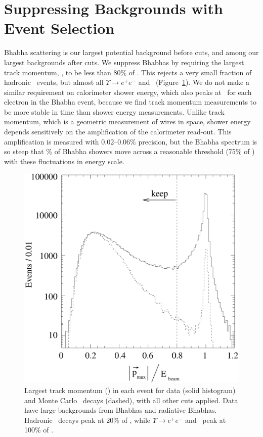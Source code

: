 \documentclass{cornell}
\begin{document}
\section{Suppressing Backgrounds with Event Selection}

Bhabha scattering is our largest potential background before cuts, and
among our largest backgrounds after cuts.  We suppress Bhabhas by
requiring the largest track momentum, \pmax, to be less than 80\% of
\ebeam.  This rejects a very small fraction of hadronic \ups\ events,
but almost all $\Upsilon \to e^+e^-$ and \mumu\ (Figure~\ref{pmax}).
We do not make a similar requirement on calorimeter shower energy,
which also peaks at \ebeam\ for each electron in the Bhabha event,
because we find track momentum measurements to be more stable in time
than shower energy measurements.  Unlike track momentum, which is a
geometric measurement of wires in space, shower energy depends
sensitively on the amplification of the calorimeter read-out.  This
amplification is measured with 0.02--0.06\% precision, but the Bhabha
spectrum is so steep that \bork\% of Bhabha showers move across a
reasonable threshold (75\% of \ebeam) with these fluctuations in
energy scale.

\begin{figure}[p]
  \begin{center}
    \includegraphics[width=\linewidth]{plots/pmax}
  \end{center}
  \caption{\label{pmax} Largest track momentum (\pmax) in each event
  for data (solid histogram) and Monte Carlo \ups\ decays (dashed),
  with all other cuts applied.  Data have large backgrounds from
  Bhabhas and radiative Bhabhas.  Hadronic \ups\ decays peak at 20\%
  of \ebeam, while $\Upsilon \to e^+e^-$ and \mumu\ peak at 100\% of
  \ebeam.}
\end{figure}
\end{document}
